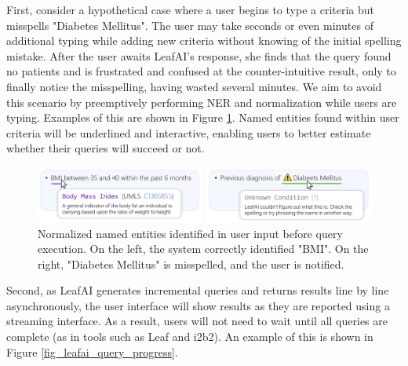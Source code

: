 \documentclass[../main.tex]{subfiles}
\begin{document}
First, consider a hypothetical case where a user begins to type a criteria but misspells "Diabetes Mellitus". The user may take seconds or even minutes of additional typing while adding new criteria without knowing of the initial spelling mistake. After the user awaits LeafAI's response, she finds that the query found no patients and is frustrated and confused at the counter-intuitive result, only to finally notice the misspelling, having wasted several minutes. We aim to avoid this scenario by preemptively performing NER and normalization while users are typing. Examples of this are shown in Figure \ref{fig_leafai_mouse_hover}. Named entities found within user criteria will be underlined and interactive, enabling users to better estimate whether their queries will succeed or not.

\begin{figure}[h!]
  \centering
  \includegraphics[scale=0.68]{Figures/8_future_work/leafai_mouse_hover.pdf}  
  \caption{Normalized named entities identified in user input before query execution. On the left, the system correctly identified "BMI". On the right, "Diabetes Mellitus" is misspelled, and the user is notified.}
\label{fig_leafai_mouse_hover}
\end{figure}

Second, as LeafAI generates incremental queries and returns results line by line asynchronously, the user interface will show results as they are reported using a streaming interface. As a result, users will not need to wait until all queries are complete (as in tools such as Leaf and i2b2). An example of this is shown in Figure \ref{fig_leafai_query_progress}.
\end{document}
